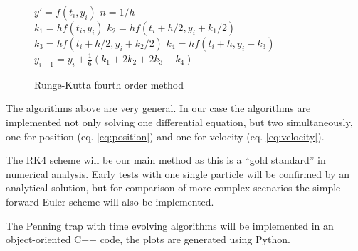 \documentclass[english,notitlepage,reprint,nofootinbib]{revtex4-1}  %
\begin{document}
\begin{figure}[H]
    \begin{algorithm}[H]
        \caption{Runge-Kutta fourth order method}
        \label{algo:RK4}
        \begin{algorithmic}
            \State $y' = f(t_i,y_i)$        
            \State $n = 1 / h$ 
            \\
            \State $k_1 = hf(t_i,y_i)$  
            \State $k_2 = hf(t_i + h/2, y_i +k_1/2)$  
            \State $k_3 = hf(t_i + h/2, y_i + k_2/2)$ 
            \State $k_4 = hf(t_i + h, y_i + k_3)$ 
            \State $y_{i+1} = y_i + \frac{1}{6}(k_1 + 2k_2 + 2k_3 + k_4)$ 
            \EndFor
            \EndProcedure
        \end{algorithmic}
    \end{algorithm}
\end{figure}
The algorithms above are very general. In our case the algorithms are implemented not only solving one differential equation, but two simultaneously, one for position (eq. \ref{eq:position}) and one for velocity (eq. \ref{eq:velocity}). 

The RK4 scheme will be our main method as this is a ``gold standard'' in numerical analysis.
Early tests with one single particle will be confirmed by an analytical solution, but for comparison of more complex
scenarios the simple forward Euler scheme will also be implemented.

The Penning trap with time evolving algorithms will be implemented in an object-oriented C++ code, the plots are generated using Python.
\end{document}
